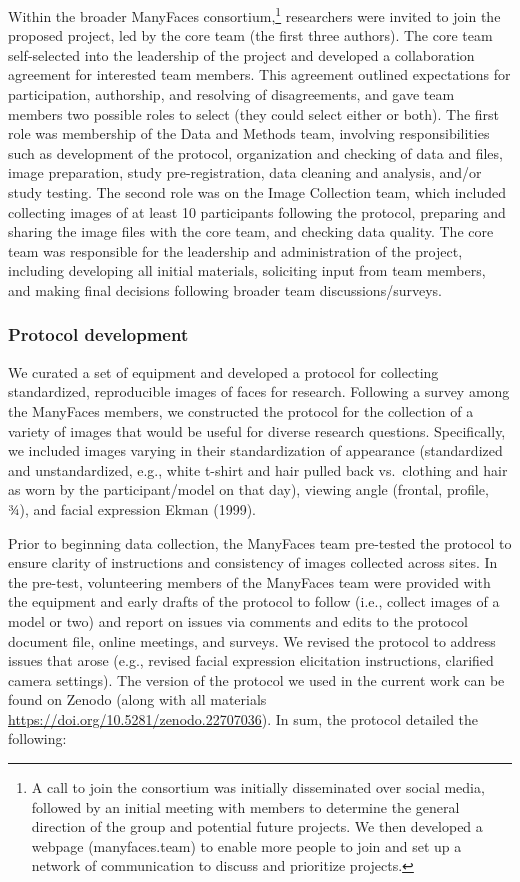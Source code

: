 \documentclass[
  letterpaper,
  DIV=11,
  numbers=noendperiod]{scrartcl}
\begin{document}
Within the broader ManyFaces consortium,\footnote{A call to join the
  consortium was initially disseminated over social media, followed by
  an initial meeting with members to determine the general direction of
  the group and potential future projects. We then developed a webpage
  (manyfaces.team) to enable more people to join and set up a network of
  communication to discuss and prioritize projects.} researchers were
invited to join the proposed project, led by the core team (the first
three authors). The core team self-selected into the leadership of the
project and developed a collaboration agreement for interested team
members. This agreement outlined expectations for participation,
authorship, and resolving of disagreements, and gave team members two
possible roles to select (they could select either or both). The first
role was membership of the Data and Methods team, involving
responsibilities such as development of the protocol, organization and
checking of data and files, image preparation, study pre-registration,
data cleaning and analysis, and/or study testing. The second role was on
the Image Collection team, which included collecting images of at least
10 participants following the protocol, preparing and sharing the image
files with the core team, and checking data quality. The core team was
responsible for the leadership and administration of the project,
including developing all initial materials, soliciting input from team
members, and making final decisions following broader team
discussions/surveys.

\subsubsection{Protocol development}\label{protocol-development}

We curated a set of equipment and developed a protocol for collecting
standardized, reproducible images of faces for research. Following a
survey among the ManyFaces members, we constructed the protocol for the
collection of a variety of images that would be useful for diverse
research questions. Specifically, we included images varying in their
standardization of appearance (standardized and unstandardized, e.g.,
white t-shirt and hair pulled back vs.~clothing and hair as worn by the
participant/model on that day), viewing angle (frontal, profile, ¾), and
facial expression Ekman (1999).

Prior to beginning data collection, the ManyFaces team pre-tested the
protocol to ensure clarity of instructions and consistency of images
collected across sites. In the pre-test, volunteering members of the
ManyFaces team were provided with the equipment and early drafts of the
protocol to follow (i.e., collect images of a model or two) and report
on issues via comments and edits to the protocol document file, online
meetings, and surveys. We revised the protocol to address issues that
arose (e.g., revised facial expression elicitation instructions,
clarified camera settings). The version of the protocol we used in the
current work can be found on Zenodo (along with all materials
\url{https://doi.org/10.5281/zenodo.22707036}). In sum, the protocol
detailed the following:
\end{document}
